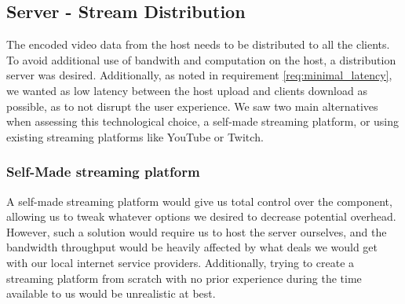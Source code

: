     
    
    
    
    
    
    
    
    
    
    
    
    
    
    

\subsection{Server - Stream Distribution} %
The encoded video data from the host needs to be distributed to all the clients. To avoid additional use of bandwith and computation on the host, a distribution server was desired. Additionally, as noted in requirement \ref{req:minimal_latency}, we wanted as low latency between the host upload and clients download as possible, as to not disrupt the user experience. We saw two main alternatives when assessing this technological choice, a self-made streaming platform, or using existing streaming platforms like YouTube or Twitch.

    
\subsubsection{Self-Made streaming platform}
A self-made streaming platform would give us total control over the component, allowing us to tweak whatever options we desired to decrease potential overhead. However, such a solution would require us to host the server ourselves, and the bandwidth throughput would be heavily affected by what deals we would get with our local internet service providers. Additionally, trying to create a streaming platform from scratch with no prior experience during the time available to us would be unrealistic at best. 


